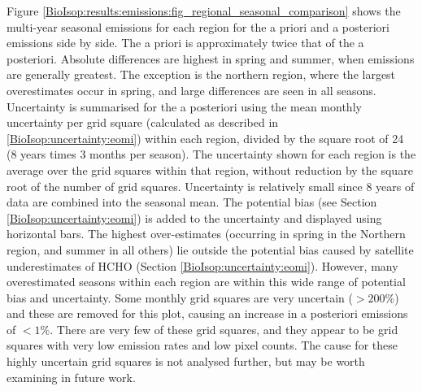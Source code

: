     
    Figure \ref{BioIsop:results:emissions:fig_regional_seasonal_comparison} shows the multi-year seasonal emissions for each region for the a priori and a posteriori emissions side by side.
    The a priori is approximately twice that of the a posteriori.
    Absolute differences are highest in spring and summer, when emissions are generally greatest.
    The exception is the northern region, where the largest overestimates occur in spring, and large differences are seen in all seasons.
    Uncertainty is summarised for the a posteriori using the mean monthly uncertainty per grid square (calculated as described in \ref{BioIsop:uncertainty:eomi}) within each region, divided by the square root of 24 (8 years times 3 months per season).
    The uncertainty shown for each region is the average over the grid squares within that region, without reduction by the square root of the number of grid squares.
    Uncertainty is relatively small since 8 years of data are combined into the seasonal mean.
    The potential bias (see Section \ref{BioIsop:uncertainty:eomi}) is added to the uncertainty and displayed using horizontal bars.
    The highest over-estimates (occurring in spring in the Northern region, and summer in all others) lie outside the potential bias caused by satellite underestimates of HCHO (Section \ref{BioIsop:uncertainty:eomi}).
    However, many overestimated seasons within each region are within this wide range of potential bias and uncertainty.
    Some monthly grid squares are very uncertain ($>200\%$) and these are removed for this plot, causing an increase in a posteriori emissions of $<1\%$.
    There are very few of these grid squares, and they appear to be grid squares with very low emission rates and low pixel counts.
    The cause for these highly uncertain grid squares is not analysed further, but may be worth examining in future work.
    
    
